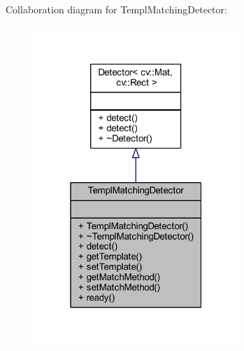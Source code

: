 Collaboration diagram for Templ\+Matching\+Detector\+:
\nopagebreak
\begin{figure}[H]
\begin{center}
\leavevmode
\includegraphics[width=220pt]{class_viscv_1_1_templ_matching_detector__coll__graph}
\end{center}
\end{figure}
